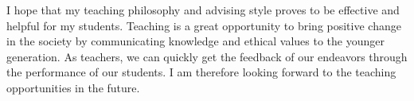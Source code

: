 \documentclass{NSF}
\begin{document}
I hope that my teaching philosophy and advising style proves to be effective and helpful for my students. Teaching is a great opportunity to bring positive change in the society by communicating knowledge and ethical values to the younger generation. As teachers, we can quickly get the feedback of our endeavors through the performance of our students. I am therefore looking forward to the teaching opportunities in the future.  
\end{document}
